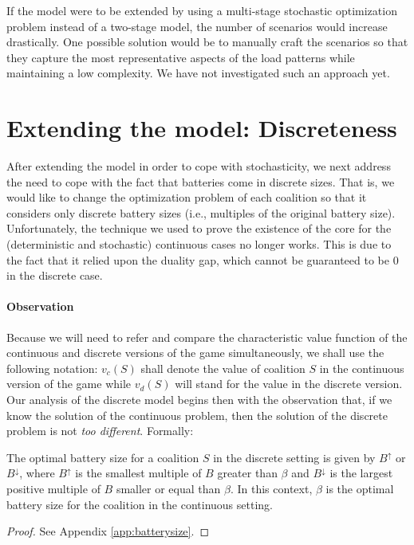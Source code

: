 \documentclass[sigconf, table]{acmart}
\begin{document}
If the model were to be extended by using a multi-stage stochastic optimization problem instead of a two-stage model, the number of scenarios would increase drastically. One possible solution would be to manually craft the scenarios so that they capture the most representative aspects of the load patterns while maintaining a low complexity. We have not investigated such an approach yet.

\section{Extending the model: Discreteness}

After extending the model in order to cope with stochasticity, we next address the need to cope with the fact that batteries come in discrete sizes. That is, we would like to change the optimization problem of each coalition so that it considers only discrete battery sizes (i.e., multiples of the original battery size).
Unfortunately, the technique we used to prove the existence of the core for the (deterministic and stochastic) continuous cases no longer works. This is due to the fact that it relied upon the duality gap, which cannot be guaranteed to be $0$ in the discrete case.

\paragraph{\textbf{Observation}}
Because we will need to refer and compare the characteristic value function of the continuous and discrete versions of the game simultaneously, we shall use the following notation: $v_c(S)$ shall denote the value of coalition $S$ in the continuous version of the game while $v_d(S)$ will stand for the value in the discrete version.\\

Our analysis of the discrete model begins then with the observation that, if we know the solution of the continuous problem, then the solution of the discrete problem is not \textit{too different}. Formally:

\begin{theorem}\label{th:batterysize_round}
The optimal battery size for a coalition $S$ in the discrete setting is given by $B^{\uparrow}$ or $B^{\downarrow}$, where $B^{\uparrow}$ is the smallest multiple of $B$ greater than $\beta$ and $B^{\downarrow}$ is the largest positive multiple of $B$ smaller or equal than $\beta$. In this context, $\beta$ is the optimal battery size for the coalition in the continuous setting.
\end{theorem}
\begin{proof}

See Appendix \ref{app:batterysize}.
  
\end{proof}
\end{document}
